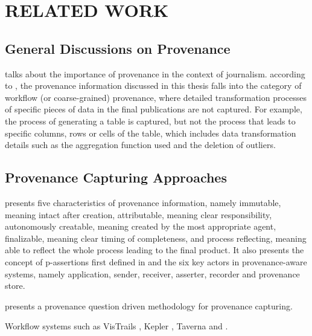 
\chapter{RELATED WORK}

\section{General Discussions on Provenance}
\cite{jarvis2010importance} talks about the importance of provenance in the context of journalism. 
according to \cite{tan2007provenance}, the provenance information discussed in this thesis falls into the category of workflow (or coarse-grained) provenance, where detailed transformation processes of specific pieces of data in the final publications are not captured. For example, the process of generating a table is captured, but not the process that leads to specific columns, rows or cells of the table, which includes data transformation details such as the aggregation function used and the deletion of outliers.

\section{Provenance Capturing Approaches}
\cite{groth2009recording} presents five characteristics of provenance information, namely immutable, meaning intact after creation, attributable, meaning clear responsibility, autonomously creatable, meaning created by the most appropriate agent, finalizable, meaning clear timing of completeness, and process reflecting, meaning able to reflect the whole process leading to the final product. It also presents the concept of p-assertions first defined in \cite{groth2006architecture} and the six key actors in provenance-aware systems, namely application, sender, receiver, asserter, recorder and provenance store.

\cite{miles2011prime} presents a provenance question driven methodology for provenance capturing.

Workflow systems such as VisTrails \cite{freire2014reproducibility}, Kepler \cite{ludascher2006scientific}, Taverna \cite{wolstencroft2013taverna} and \cite{ReproZip}.

